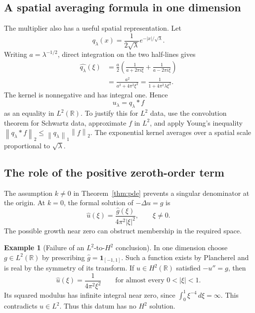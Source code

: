 \documentclass[11pt]{article}
\numberwithin{equation}{section}
\theoremstyle{definition}
\newtheorem{example}[theorem]{Example}
\theoremstyle{remark}
\newcommand{\R}{\mathbb R}
\newcommand{\dd}{\,d}
\newcommand{\norm}[1]{\left\|#1\right\|}
\newcommand{\wh}[1]{\widehat{#1}}
\begin{document}
\subsection{A spatial averaging formula in one dimension}
The multiplier also has a useful spatial representation. Let
\[
 q_\lambda(x)=\frac1{2\sqrt\lambda}e^{-|x|/\sqrt\lambda}.
\]
Writing \(a=\lambda^{-1/2}\), direct integration on the two half-lines gives
\begin{align*}
 \wh{q_\lambda}(\xi)
 &=\frac a2\left(\frac1{a+2\pi i\xi}+\frac1{a-2\pi i\xi}\right)\\
 &=\frac{a^2}{a^2+4\pi^2\xi^2}
 =\frac1{1+4\pi^2\lambda\xi^2}.
\end{align*}
The kernel is nonnegative and has integral one. Hence
\begin{equation}\label{eq:kernel}
 u_\lambda=q_\lambda*f
\end{equation}
as an equality in \(L^2(\R)\). To justify this for \(L^2\) data, use the convolution theorem for Schwartz data, approximate \(f\) in \(L^2\), and apply Young's inequality
\(\norm{q_\lambda*f}_2\le\norm{q_\lambda}_1\norm f_2\).
The exponential kernel averages over a spatial scale proportional to \(\sqrt\lambda\).

\subsection{The role of the positive zeroth-order term}
The assumption \(k\ne0\) in Theorem~\ref{thm:pde} prevents a singular denominator at the origin. At \(k=0\), the formal solution of \(-\Delta u=g\) is
\[
 \wh u(\xi)=\frac{\wh g(\xi)}{4\pi^2|\xi|^2},\qquad\xi\ne0.
\]
The possible growth near zero can obstruct membership in the required space.

\begin{example}[Failure of an \(L^2\)-to-\(H^2\) conclusion]
In one dimension choose \(g\in L^2(\R)\) by prescribing
\(\wh g=\mathbf1_{[-1,1]}\). Such a function exists by Plancherel and is real by the symmetry of its transform. If \(u\in H^2(\R)\) satisfied \(-u''=g\), then
\[
 \wh u(\xi)=\frac1{4\pi^2\xi^2}
       \qquad\text{for almost every }0<|\xi|<1.
\]
Its squared modulus has infinite integral near zero, since
\(\int_0^1\xi^{-4}\dd\xi=\infty\). This contradicts \(u\in L^2\). Thus this datum has no \(H^2\) solution.
\end{example}

\appendix
\end{document}
